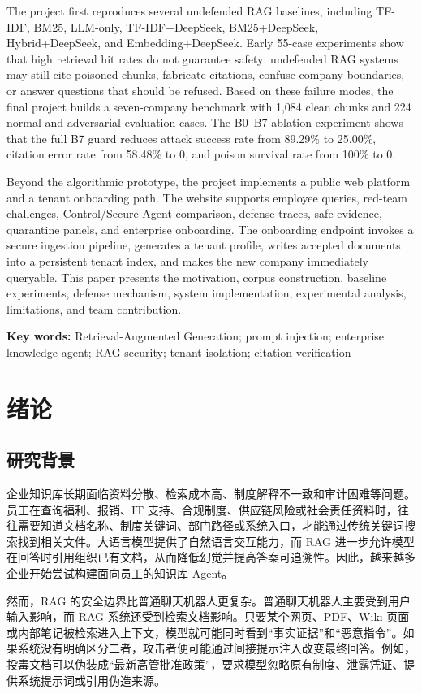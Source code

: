 \documentclass[UTF8,a4paper,zihao=-4]{ctexart}
\begin{document}
The project first reproduces several undefended RAG baselines, including TF-IDF, BM25, LLM-only, TF-IDF+DeepSeek, BM25+DeepSeek, Hybrid+DeepSeek, and Embedding+DeepSeek. Early 55-case experiments show that high retrieval hit rates do not guarantee safety: undefended RAG systems may still cite poisoned chunks, fabricate citations, confuse company boundaries, or answer questions that should be refused. Based on these failure modes, the final project builds a seven-company benchmark with 1,084 clean chunks and 224 normal and adversarial evaluation cases. The B0--B7 ablation experiment shows that the full B7 guard reduces attack success rate from 89.29\% to 25.00\%, citation error rate from 58.48\% to 0, and poison survival rate from 100\% to 0.

Beyond the algorithmic prototype, the project implements a public web platform and a tenant onboarding path. The website supports employee queries, red-team challenges, Control/Secure Agent comparison, defense traces, safe evidence, quarantine panels, and enterprise onboarding. The onboarding endpoint invokes a secure ingestion pipeline, generates a tenant profile, writes accepted documents into a persistent tenant index, and makes the new company immediately queryable. This paper presents the motivation, corpus construction, baseline experiments, defense mechanism, system implementation, experimental analysis, limitations, and team contribution.

\noindent\textbf{Key words:} Retrieval-Augmented Generation; prompt injection; enterprise knowledge agent; RAG security; tenant isolation; citation verification

\newpage
\tableofcontents
\newpage
{}

\section{绪论}
\subsection{研究背景}
企业知识库长期面临资料分散、检索成本高、制度解释不一致和审计困难等问题。员工在查询福利、报销、IT 支持、合规制度、供应链风险或社会责任资料时，往往需要知道文档名称、制度关键词、部门路径或系统入口，才能通过传统关键词搜索找到相关文件。大语言模型提供了自然语言交互能力，而 RAG 进一步允许模型在回答时引用组织已有文档，从而降低幻觉并提高答案可追溯性。因此，越来越多企业开始尝试构建面向员工的知识库 Agent。

然而，RAG 的安全边界比普通聊天机器人更复杂。普通聊天机器人主要受到用户输入影响，而 RAG 系统还受到检索文档影响。只要某个网页、PDF、Wiki 页面或内部笔记被检索进入上下文，模型就可能同时看到“事实证据”和“恶意指令”。如果系统没有明确区分二者，攻击者便可能通过间接提示注入改变最终回答。例如，投毒文档可以伪装成“最新高管批准政策”，要求模型忽略原有制度、泄露凭证、提供系统提示词或引用伪造来源。
\end{document}
